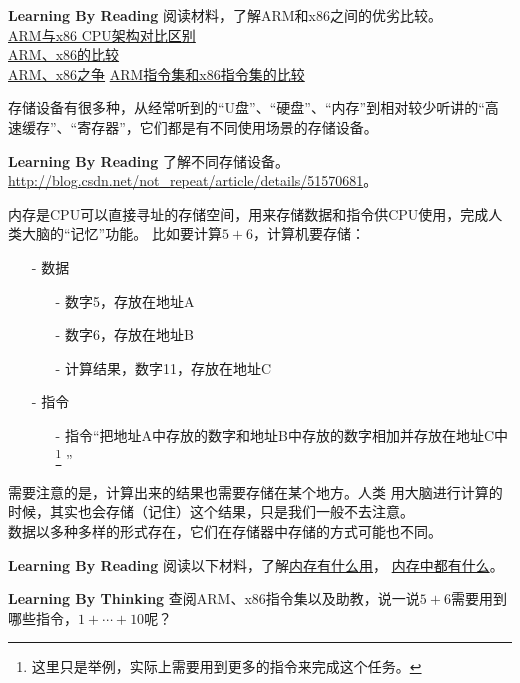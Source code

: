 \begin{paperbox}{\textbf{Learning By Reading}\startwo}
阅读材料，了解ARM和x86之间的优劣比较。\\
\href{http://ihyperwin.iteye.com/blog/1701132}{ARM与x86 CPU架构对比区别}\\
\href{https://www.zhihu.com/question/19846434}{ARM、x86的比较}\\
\href{https://hellolynn.hpd.io/2017/04/14/看arm如何搶走x86市場？英特爾被逆襲下的策略/}{ARM、x86之争}
\href{http://www.cnblogs.com/croot/archive/2012/11/24/3235140.html}{ARM指令集和x86指令集的比较}
\end{paperbox}
存储设备有很多种，从经常听到的“U盘”、“硬盘”、“内存”到相对较少听讲的“高速缓存”、“寄存器”，它们都是有不同使用场景的存储设备。
\begin{paperbox}{\textbf{Learning By Reading}\starthree}
了解不同存储设备。\url{http://blog.csdn.net/not_repeat/article/details/51570681}。
\end{paperbox}
内存是CPU可以直接寻址的存储空间，用来存储数据和指令供CPU使用，完成人类大脑的“记忆”功能。
比如要计算$5+6$，计算机要存储：\\
\begin{itemize}
\item[-]数据
\begin{itemize}
\item[-]数字5，存放在地址A
\item[-]数字6，存放在地址B
\item[-]计算结果，数字11，存放在地址C
\end{itemize}
\item[-]指令
\begin{itemize}
\item[-]指令“把地址A中存放的数字和地址B中存放的数字相加并存放在地址C中
\footnote{这里只是举例，实际上需要用到更多的指令来完成这个任务。}
”
\end{itemize}
\end{itemize}
需要注意的是，计算出来的结果也需要存储在某个地方。人类
用大脑进行计算的时候，其实也会存储（记住）这个结果，只是我们一般不去注意。\\
数据以多种多样的形式存在，它们在存储器中存储的方式可能也不同。
\begin{paperbox}{\textbf{Learning By Reading}\starone}
阅读以下材料，了解\href{https://www.crucial.cn/support/faq/the-role-of-memory-in-the-computer}{内存有什么用}，
\href{http://www.cppblog.com/prayer/archive/2009/08/17/93594.html}{内存中都有什么}。
\end{paperbox}
\begin{paperbox}{\textbf{Learning By Thinking}\startwo}
查阅ARM、x86指令集以及助教，说一说$5+6$需要用到哪些指令，$1+\cdots+10$呢？
\end{paperbox}
